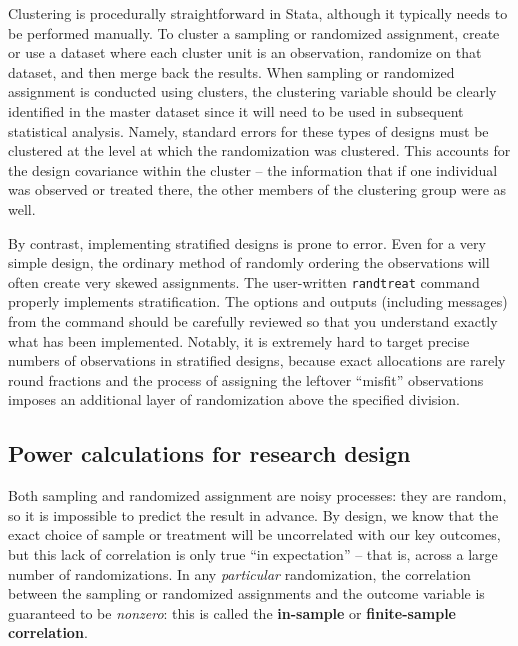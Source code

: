 Clustering is procedurally straightforward in Stata,
although it typically needs to be performed manually.
To cluster a sampling or randomized assignment,
create or use a dataset where each cluster unit is an observation,
randomize on that dataset, and then merge back the results.
When sampling or randomized assignment is conducted using clusters,
the clustering variable should be clearly identified in the master dataset
since it will need to be used in subsequent statistical analysis.
Namely, standard errors for these types of designs must be clustered
at the level at which the randomization was clustered.
This accounts for the design covariance within the cluster --
the information that if one individual was observed or treated there,
the other members of the clustering group were as well.

By contrast, implementing stratified designs is prone to error.
Even for a very simple design, the ordinary method of randomly ordering the observations
will often create very skewed assignments.
The user-written \texttt{randtreat} command properly implements stratification.\cite{carril2017dealing}
The options and outputs (including messages) from the command should be carefully reviewed
so that you understand exactly what has been implemented.
Notably, it is extremely hard to target precise numbers of observations
in stratified designs, because exact allocations are rarely round fractions
and the process of assigning the leftover ``misfit'' observations
imposes an additional layer of randomization above the specified division.


\subsection{Power calculations for research design}

Both sampling and randomized assignment are noisy processes:
they are random, so it is impossible to predict the result in advance.
By design, we know that the exact choice of sample or treatment
will be uncorrelated with our key outcomes,
but this lack of correlation is only true ``in expectation'' --
that is, across a large number of randomizations.
In any \textit{particular} randomization,
the correlation between the sampling or randomized assignments and the outcome variable
is guaranteed to be \textit{nonzero}:
this is called the \textbf{in-sample} or \textbf{finite-sample correlation}.

